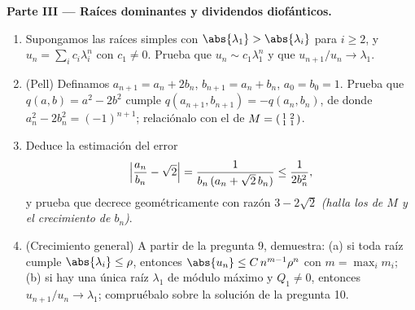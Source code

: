 \begin{problem}
\medskip
\noindent\textbf{Parte III --- Raíces dominantes y dividendos
diofánticos.}
\begin{enumerate}[resume]
  \item Supongamos las raíces simples con $\abs{\lambda_1} >
        \abs{\lambda_i}$ para $i \geq 2$, y $u_n = \sum_i c_i
        \lambda_i^n$ con $c_1 \neq 0$. Prueba que $u_n \sim
        c_1\lambda_1^n$ y que $u_{n+1}/u_n \to \lambda_1$.
  \item (Pell) Definamos $a_{n+1} = a_n + 2b_n$, $b_{n+1} = a_n +
        b_n$, $a_0 = b_0 = 1$. Prueba que $q(a, b) = a^2 - 2b^2$
        cumple $q(a_{n+1}, b_{n+1}) = -q(a_n, b_n)$, de donde
        $a_n^2 - 2b_n^2 = (-1)^{n+1}$; relaciónalo con el
         de $M = \begin{psmallmatrix}1 & 2\\ 1 &
        1\end{psmallmatrix}$.
  \item Deduce la estimación del error
        \[
        \Bigl|\frac{a_n}{b_n} - \sqrt2\Bigr|
        = \frac{1}{b_n\,(a_n + \sqrt2\,b_n)}
        \leq \frac{1}{2b_n^2},
        \]
        y prueba que decrece geométricamente con razón $3 -
        2\sqrt2$ \emph{(halla los  de $M$ y el
        crecimiento de $b_n$)}.
  \item (Crecimiento general) A partir de la pregunta 9, demuestra:
        (a) si toda raíz cumple $\abs{\lambda_i} \leq \rho$,
        entonces $\abs{u_n} \leq C\,n^{m-1}\rho^n$ con $m = \max_i
        m_i$; (b) si hay una única raíz $\lambda_1$ de módulo
        máximo y $Q_1 \neq 0$, entonces $u_{n+1}/u_n \to
        \lambda_1$; compruébalo sobre la solución de la pregunta
        10.
\end{enumerate}


\end{problem}
